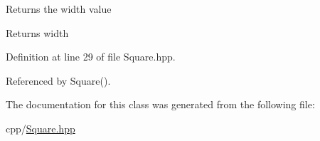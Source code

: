 Returns the width value \begin{DoxyReturn}{Returns}
width 
\end{DoxyReturn}


Definition at line 29 of file Square.\+hpp.



Referenced by Square().



The documentation for this class was generated from the following file\+:\begin{DoxyCompactItemize}
\item 
cpp/\mbox{\hyperlink{_square_8hpp}{Square.\+hpp}}\end{DoxyCompactItemize}
